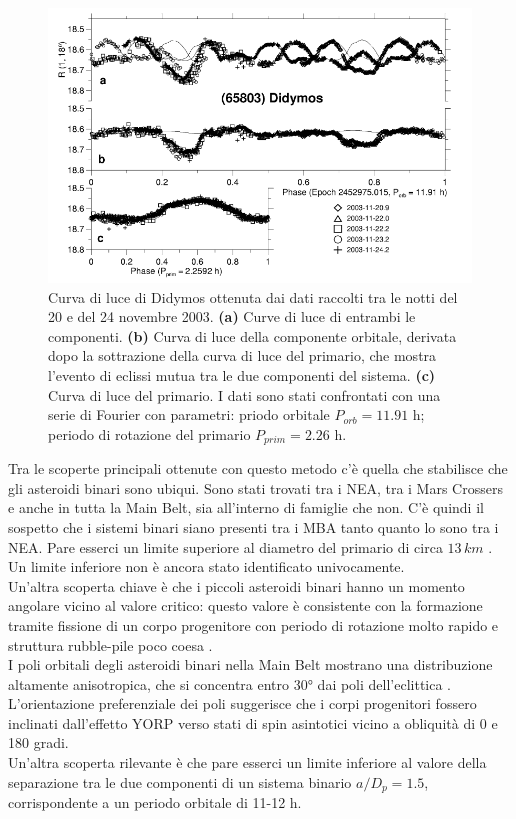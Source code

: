 \documentclass[a4paper,11pt,openright]{book}
\begin{document}
\begin{figure}[!h]
    \centering
    \includegraphics[scale=0.55]{figure/didymos_lightcurve.png}
    \caption[Curva di luce di (65803) Didymos.]{Curva di luce di Didymos ottenuta dai dati raccolti tra le notti del 20 e del 24 novembre 2003. \textbf{(a)} Curve di luce di entrambi le componenti. \textbf{(b)} Curva di luce della componente orbitale, derivata dopo la sottrazione della curva di luce del primario, che mostra l'evento di eclissi mutua tra le due componenti del sistema. \textbf{(c)} Curva di luce del primario. I dati sono stati confrontati con una serie di Fourier con parametri: priodo orbitale $P_{orb}=11.91$ h; periodo di rotazione del primario $P_{prim}=2.26$ h. \citep{pravec_photometric_2006}}
    \label{fig:didymos_lightcurve}
\end{figure}

Tra le scoperte principali ottenute con questo metodo c'è quella che stabilisce che gli asteroidi binari sono ubiqui. Sono stati trovati tra i NEA, tra i Mars Crossers e anche in tutta la Main Belt, sia all'interno di famiglie che non. C'è quindi il sospetto che i sistemi binari siano presenti tra i MBA tanto quanto lo sono tra i NEA. Pare esserci un limite superiore al diametro del primario di circa $13\,km$ \citep{carry_small_2015}. Un limite inferiore non è ancora stato identificato univocamente.\\
Un'altra scoperta chiave è che i piccoli asteroidi binari hanno un momento angolare vicino al valore critico: questo valore è consistente con la formazione tramite fissione di un corpo progenitore con periodo di rotazione molto rapido e struttura rubble-pile poco coesa \citep{pravec_binary_2007}.\\
I poli orbitali degli asteroidi binari nella Main Belt mostrano una distribuzione altamente anisotropica, che si concentra entro 30° dai poli dell'eclittica \citep{pravec_binary_2012}. L'orientazione preferenziale dei poli suggerisce che i corpi progenitori fossero inclinati dall'effetto YORP verso stati di spin asintotici vicino a obliquità di 0 e 180 gradi.\\
Un'altra scoperta rilevante è che pare esserci un limite inferiore al valore della separazione tra le due componenti di un sistema binario $a/D_p=1.5$, corrispondente a un periodo orbitale di 11-12 h.\\
\end{document}

